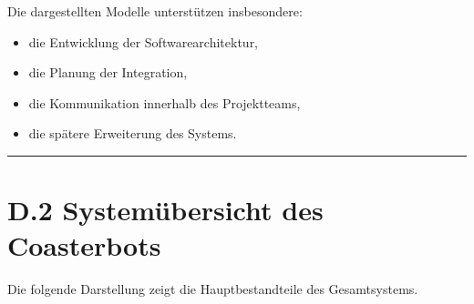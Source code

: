 \documentclass[
]{article}
\providecommand{\tightlist}{%
  \setlength{\itemsep}{0pt}\setlength{\parskip}{0pt}}
\begin{document}
Die dargestellten Modelle unterstützen insbesondere:

\begin{itemize}
\tightlist
\item
  die Entwicklung der Softwarearchitektur,
\item
  die Planung der Integration,
\item
  die Kommunikation innerhalb des Projektteams,
\item
  die spätere Erweiterung des Systems.
\end{itemize}

\begin{center}\rule{0.5\linewidth}{0.5pt}\end{center}

\section{D.2 Systemübersicht des
Coasterbots}\label{d.2-systemuxfcbersicht-des-coasterbots}

Die folgende Darstellung zeigt die Hauptbestandteile des Gesamtsystems.
\end{document}
